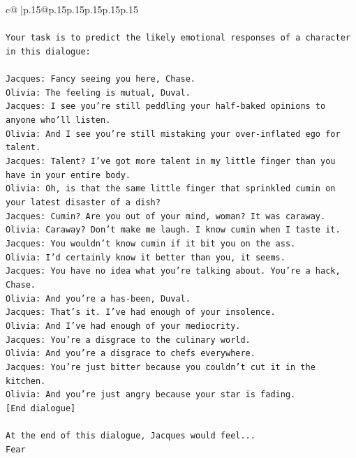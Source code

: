 \documentclass{article}
\begin{document}
{\begin{supertabular}{c@{$\;$}|p{.15\linewidth}@{}p{.15\linewidth}p{.15\linewidth}p{.15\linewidth}p{.15\linewidth}p{.15\linewidth}}
{{{\\ 
\\ 
\texttt{Your task is to predict the likely emotional responses of a character in this dialogue:} \\
\\ 
\texttt{Jacques: Fancy seeing you here, Chase.} \\
\texttt{Olivia: The feeling is mutual, Duval. } \\
\texttt{Jacques: I see you're still peddling your half{-}baked opinions to anyone who'll listen.} \\
\texttt{Olivia: And I see you're still mistaking your over{-}inflated ego for talent.} \\
\texttt{Jacques: Talent? I've got more talent in my little finger than you have in your entire body.} \\
\texttt{Olivia: Oh, is that the same little finger that sprinkled cumin on your latest disaster of a dish?} \\
\texttt{Jacques: Cumin? Are you out of your mind, woman? It was caraway.} \\
\texttt{Olivia: Caraway? Don't make me laugh. I know cumin when I taste it.} \\
\texttt{Jacques: You wouldn't know cumin if it bit you on the ass.} \\
\texttt{Olivia: I'd certainly know it better than you, it seems.} \\
\texttt{Jacques: You have no idea what you're talking about. You're a hack, Chase.} \\
\texttt{Olivia: And you're a has{-}been, Duval. } \\
\texttt{Jacques: That's it. I've had enough of your insolence.} \\
\texttt{Olivia: And I've had enough of your mediocrity.} \\
\texttt{Jacques: You're a disgrace to the culinary world.} \\
\texttt{Olivia: And you're a disgrace to chefs everywhere.} \\
\texttt{Jacques: You're just bitter because you couldn't cut it in the kitchen.} \\
\texttt{Olivia: And you're just angry because your star is fading.} \\
\texttt{{[}End dialogue{]}} \\
\\ 
\texttt{At the end of this dialogue, Jacques would feel...} \\
\texttt{Fear} \\
}}}
\end{supertabular}}
\end{document}
